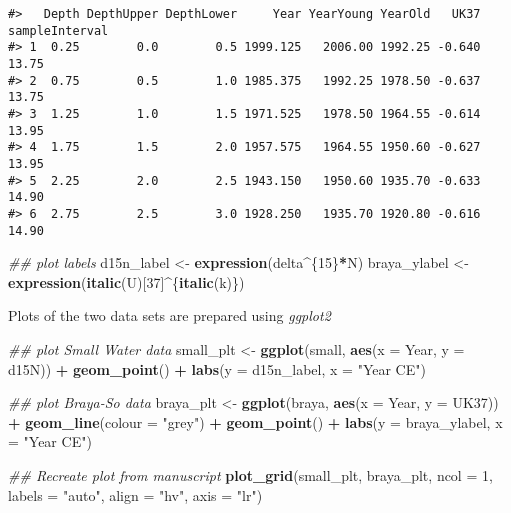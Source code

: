 \documentclass[12pt,]{article}
\newenvironment{Shaded}{\begin{snugshade}}{\end{snugshade}}
\newcommand{\CommentTok}[1]{\textcolor[rgb]{0.56,0.35,0.01}{\textit{#1}}}
\newcommand{\DataTypeTok}[1]{\textcolor[rgb]{0.13,0.29,0.53}{#1}}
\newcommand{\DecValTok}[1]{\textcolor[rgb]{0.00,0.00,0.81}{#1}}
\newcommand{\KeywordTok}[1]{\textcolor[rgb]{0.13,0.29,0.53}{\textbf{#1}}}
\newcommand{\NormalTok}[1]{#1}
\newcommand{\OperatorTok}[1]{\textcolor[rgb]{0.81,0.36,0.00}{\textbf{#1}}}
\newcommand{\StringTok}[1]{\textcolor[rgb]{0.31,0.60,0.02}{#1}}
\begin{document}
\begin{verbatim}
#>   Depth DepthUpper DepthLower     Year YearYoung YearOld   UK37 sampleInterval
#> 1  0.25        0.0        0.5 1999.125   2006.00 1992.25 -0.640          13.75
#> 2  0.75        0.5        1.0 1985.375   1992.25 1978.50 -0.637          13.75
#> 3  1.25        1.0        1.5 1971.525   1978.50 1964.55 -0.614          13.95
#> 4  1.75        1.5        2.0 1957.575   1964.55 1950.60 -0.627          13.95
#> 5  2.25        2.0        2.5 1943.150   1950.60 1935.70 -0.633          14.90
#> 6  2.75        2.5        3.0 1928.250   1935.70 1920.80 -0.616          14.90
\end{verbatim}

\begin{Shaded}
\begin{Highlighting}[]
\CommentTok{## plot labels}
\NormalTok{d15n_label <-}\StringTok{ }\KeywordTok{expression}\NormalTok{(delta}\OperatorTok{^}\NormalTok{\{}\DecValTok{15}\NormalTok{\}}\OperatorTok{*}\NormalTok{N)}
\NormalTok{braya_ylabel <-}\StringTok{ }\KeywordTok{expression}\NormalTok{(}\KeywordTok{italic}\NormalTok{(U)[}\DecValTok{37}\NormalTok{]}\OperatorTok{^}\NormalTok{\{}\KeywordTok{italic}\NormalTok{(k)\})}
\end{Highlighting}
\end{Shaded}

Plots of the two data sets are prepared using \emph{ggplot2}

\begin{Shaded}
\begin{Highlighting}[]
\CommentTok{## plot Small Water data}
\NormalTok{small_plt <-}\StringTok{ }\KeywordTok{ggplot}\NormalTok{(small, }\KeywordTok{aes}\NormalTok{(}\DataTypeTok{x =}\NormalTok{ Year, }\DataTypeTok{y =}\NormalTok{ d15N)) }\OperatorTok{+}
\StringTok{    }\KeywordTok{geom_point}\NormalTok{() }\OperatorTok{+}
\StringTok{    }\KeywordTok{labs}\NormalTok{(}\DataTypeTok{y =}\NormalTok{ d15n_label, }\DataTypeTok{x =} \StringTok{"Year CE"}\NormalTok{)}

\CommentTok{## plot Braya-So data}
\NormalTok{braya_plt <-}\StringTok{ }\KeywordTok{ggplot}\NormalTok{(braya, }\KeywordTok{aes}\NormalTok{(}\DataTypeTok{x =}\NormalTok{ Year, }\DataTypeTok{y =}\NormalTok{ UK37)) }\OperatorTok{+}
\StringTok{    }\KeywordTok{geom_line}\NormalTok{(}\DataTypeTok{colour =} \StringTok{"grey"}\NormalTok{) }\OperatorTok{+}
\StringTok{    }\KeywordTok{geom_point}\NormalTok{() }\OperatorTok{+}
\StringTok{    }\KeywordTok{labs}\NormalTok{(}\DataTypeTok{y =}\NormalTok{ braya_ylabel, }\DataTypeTok{x =} \StringTok{"Year CE"}\NormalTok{)}

\CommentTok{## Recreate plot from manuscript}
\KeywordTok{plot_grid}\NormalTok{(small_plt, braya_plt, }\DataTypeTok{ncol =} \DecValTok{1}\NormalTok{, }\DataTypeTok{labels =} \StringTok{"auto"}\NormalTok{, }\DataTypeTok{align =} \StringTok{"hv"}\NormalTok{,}
          \DataTypeTok{axis =} \StringTok{"lr"}\NormalTok{)}
\end{Highlighting}
\end{Shaded}
\end{document}

